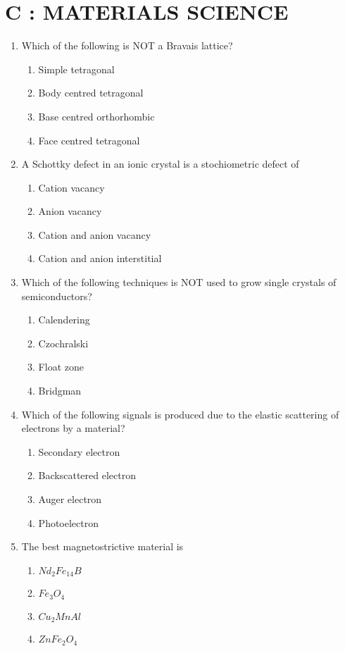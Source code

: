 \documentclass[journal]{IEEEtran}
\begin{document}
\section*{C : MATERIALS SCIENCE}
\begin{enumerate}[start=1]
\item Which of the following is NOT a Bravais lattice?
\begin{enumerate}
    \item Simple tetragonal
    \item Body centred tetragonal
    \item Base centred orthorhombic
    \item Face centred tetragonal
\end{enumerate}
\item A Schottky defect in an ionic crystal is a stochiometric defect of
\begin{enumerate}
    \item Cation vacancy
    \item Anion vacancy
    \item Cation and anion vacancy
    \item Cation and anion interstitial
\end{enumerate}
\item Which of the following techniques is NOT used to grow single crystals of semiconductors?
    \begin{enumerate}
    \item Calendering \item Czochralski \item Float zone \item Bridgman
\end{enumerate}
\item Which of the following signals is produced due to the elastic scattering of electrons by a material?
\begin{enumerate}
    \item Secondary electron
    \item Backscattered electron
    \item Auger electron
    \item Photoelectron
\end{enumerate}
\item The best magnetostrictive material is
\begin{enumerate}
    \item $Nd_2Fe_{14}B$ \item $Fe_3O_4$ \item $Cu_2MnAl$ \item $ZnFe_2O_4$

\end{enumerate}
\end{enumerate}
\end{document}
